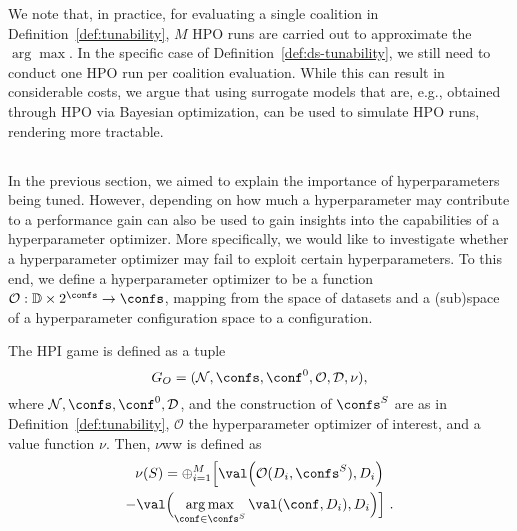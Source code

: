 We note that, in practice, for evaluating a single coalition in Definition~\ref{def:tunability}, $M$ HPO runs are carried out to approximate the $\arg\max$. In the specific case of Definition~\ref{def:ds-tunability}, we still need to conduct one HPO run per coalition evaluation. While this can result in considerable costs, we argue that using surrogate models that are, e.g., obtained through HPO via Bayesian optimization, can be used to simulate HPO runs, rendering \tool more tractable.

\subsection{\opthabit}\label{sec:opthabit}

In the previous section, we aimed to explain the importance of hyperparameters being tuned. However, depending on how much a hyperparameter may contribute to a performance gain can also be used to gain insights into the capabilities of a hyperparameter optimizer. More specifically, we would like to investigate whether a hyperparameter optimizer may fail to exploit certain hyperparameters.  
To this end, we define a hyperparameter optimizer to be a function $\mathcal{O}: \mathbb{D} \times 2^{\confs} \rightarrow \confs$, mapping from the space of datasets and a (sub)space of a hyperparameter configuration space to a configuration. 

\begin{definition} \label{def:opthabit}
    The \opthabit HPI game is defined as a tuple 
    \[
    G_O = (\mathcal{N}, \confs, \conf^0, \mathcal{O}, \mathcal{D}, \nu),
    \]
    where $\mathcal{N}, \confs, \conf^0, \mathcal{D}$, and the construction of $\confs^S$ are as in Definition~\ref{def:tunability}, $\mathcal{O}$ the hyperparameter optimizer of interest, and a value function $\nu$.
    Then, $\nu$ww is defined as
    \begin{multline}
    \nu(S) = \oplus_{i = 1}^M \Big[ \val \Big(\mathcal{O}(D_i, \confs^S), D_i \Big)\\
    - \val \Big(\underset{\conf \in \confs^S}{\arg\max}\, \val(\conf, D_i), D_i \Big) \Big] \,\, .
    \end{multline}
\end{definition}

